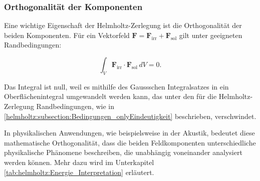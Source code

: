 \subsubsection{Orthogonalität der Komponenten}

Eine wichtige Eigenschaft der Helmholtz-Zerlegung ist die Orthogonalität der beiden Komponenten. Für ein Vektorfeld $\mathbf{F} = \mathbf{F}_{\text{irr}} + \mathbf{F}_{\text{sol}}$ gilt unter geeigneten Randbedingungen:

\begin{equation}
\int_V \mathbf{F}_{\text{irr}} \cdot \mathbf{F}_{\text{sol}} \, dV = 0.
\end{equation}

\noindent Das Integral ist null, weil es mithilfe des Gaussschen Integralsatzes in ein Oberflächenintegral umgewandelt werden kann, das unter den für die Helmholtz-Zerlegung Randbedingungen, wie in \ref{helmholtz:subsection:Bedingungen_onlyEindeutigkeit} beschrieben, verschwindet.
 
 In physikalischen Anwendungen, wie beispielsweise in der Akustik, bedeutet diese mathematische Orthogonalität, dass die beiden Feldkomponenten unterschiedliche physikalische Phänomene beschreiben, die unabhängig voneinander analysiert werden können. Mehr dazu wird im Unterkapitel \ref{tab:helmholtz:Energie_Interpretation} erläutert.


